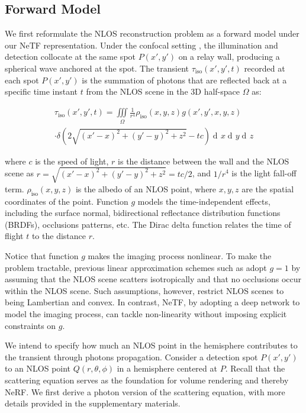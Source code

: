 \documentclass[10pt,journal,compsoc]{IEEEtran}
\DeclareMathOperator{\di}{d\!}
\begin{document}
\subsection{Forward Model}

We first reformulate the NLOS reconstruction problem as a forward model under our NeTF representation. Under the confocal setting \cite{2018LCT, 2019FK, 2020MarikoE}, the illumination and detection collocate at the same spot $P(x',y')$ on a relay wall, producing a spherical wave anchored at the spot. The transient $\tau_{\text{iso}}(x', y',t)$ recorded at each spot $P(x', y')$ is the summation of photons that are reflected back at a specific time instant $t$ from the NLOS scene in the 3D half-space $\Omega$ as: 

{
\begin{equation}
\begin{split}
\tau_{\text{iso}}(x',y',t) = \underset{\Omega}{\iiint} \frac{1}{r^4} \rho_{\text{iso}}(x,y,z)g(x', y', x, y, z)\\
\cdot \delta(2\sqrt{(x'-x)^{2}+(y'-y)^{2}+z^{2}}-tc) \di{x}\di{y}\di{z}
\end{split}
\label{isoTau}
\end{equation}
}

\noindent where $c$ is the speed of light, $r$ is the distance between the wall and the NLOS scene as $r = \sqrt{(x'-x)^{2}+(y'-y)^{2}+z^{2}} = tc/2$, and $1 / r^{4}$ is the light fall-off term. $\rho_{\text{iso}}(x,y,z)$ is the albedo of an NLOS point, where $x,y,z$ are the spatial coordinates of the point. Function $g$ models the time-independent effects, including the surface normal, bidirectional reflectance distribution functions (BRDFs), occlusions patterns, etc. The Dirac delta function relates the time of flight $t$ to the distance $r$. 

Notice that function $g$ makes the imaging process nonlinear. To make the problem tractable, previous linear approximation schemes such as \cite{2018LCT} adopt $g=1$ by assuming that the NLOS scene scatters isotropically and that no occlusions occur within the NLOS scene. Such assumptions, however, restrict NLOS scenes to being Lambertian and convex. In contrast, NeTF, by adopting a deep network to model the imaging process, can tackle non-linearity without imposing explicit constraints on $g$. 

We intend to specify how much an NLOS point in the hemisphere contributes to the transient through photons propagation. Consider a detection spot $P(x',y')$ to an NLOS point $Q(r,\theta, \phi)$ in a hemisphere centered at $P$. Recall that the scattering equation \cite{1984Kajiya} serves as the foundation for volume rendering and thereby NeRF. We first derive a photon version of the scattering equation, with more details provided in the supplementary materials. 
 
\end{document}
